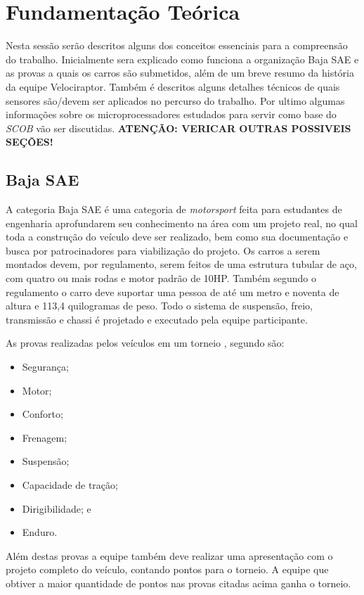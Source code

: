 \chapter{Fundamentação Teórica}
	\label{ch:fundamentacao}
Nesta sessão serão descritos alguns dos conceitos essenciais para a compreensão do trabalho. Inicialmente sera explicado como funciona a organização Baja SAE e as provas a quais os carros são submetidos, além de um breve resumo da história da equipe Velociraptor. Também é descritos alguns detalhes técnicos de quais sensores são/devem ser aplicados no percurso do trabalho. Por ultimo algumas informações sobre os microprocessadores estudados para servir como base do \textit{SCOB} vão ser discutidas. \textbf{ATENÇÃO: VERICAR OUTRAS POSSIVEIS SEÇÕES!}

\section{Baja SAE}
A categoria Baja SAE é uma categoria de \textit{motorsport} feita para estudantes de engenharia aprofundarem seu conhecimento na área com um projeto real, no qual toda a construção do veículo deve ser realizado, bem como sua documentação e busca por patrocinadores para viabilização do projeto. Os carros a serem montados devem, por regulamento, \cite{regulamentobajasae} serem feitos de uma estrutura tubular de aço, com quatro ou mais rodas e motor padrão de 10HP. Também segundo o regulamento o carro deve suportar uma pessoa de até um metro e noventa de altura e 113,4 quilogramas de peso. Todo o sistema de suspensão, freio, transmissão e chassi é projetado e executado pela equipe participante.  

As provas realizadas pelos veículos em um torneio , segundo \cite{bajasae} são:
\begin{itemize}
	\item Segurança;
	\item Motor;
	\item Conforto;
	\item Frenagem;
	\item Suspensão;
	\item Capacidade de tração;
	\item Dirigibilidade; e
	\item Enduro.
\end{itemize}

Além destas provas a equipe também deve realizar uma apresentação com o projeto completo do veículo, contando pontos para o torneio. A equipe que obtiver a maior quantidade de pontos nas provas citadas acima ganha o torneio.

